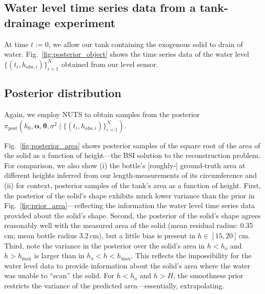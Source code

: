 \documentclass[openacc]{rsproca_new}%
\newcommand\thedata {$\{(t_i,h_{\text{obs}, i})\}_{i=1}^{N}$\xspace}
\newcommand\thedatanomath {\{(t_i,h_{\text{obs}, i})\}_{i=1}^{N}}
\begin{document}
\subsection{Water level time series data from a tank-drainage experiment}
At time $t:=0$, we allow our tank containing the exogenous solid to drain of water. Fig.~\ref{fig:posterior_object} shows the time series data of the water level \thedata obtained from our level sensor.

\subsection{Posterior distribution}
Again, we employ NUTS to obtain samples from the posterior $\pi_{\text{post}}(h_0, \boldsymbol \alpha, \boldsymbol \theta, \sigma^2 \mid \thedatanomath)$. 

Fig.~\ref{fig:posterior_area} shows posterior samples of the square root of the area of the solid as a function of height---the BSI solution to the reconstruction problem. 
For comparison, we also show (i) the bottle's [roughly-] ground-truth area at different heights inferred from our length-measurements of its circumference and (ii) for context, posterior samples of the tank's area as a function of height. First, the posterior of the solid's shape exhibits much lower variance than the prior in Fig.~\ref{fig:prior_area}---reflecting the information the water level time series data provided about the solid's shape. 
Second, the posterior of the solid's shape agrees reasonably well with the measured area of the solid (mean residual radius: 0.35\,cm; mean bottle radius 3.2\,cm), but a little bias is present in $h\in[15, 20]$\,cm.
Third, note the variance in the posterior over the solid's area in $h<h_o$ and $h>h_{\text{max}}$ is larger than in $h_o < h < h_{\text{max}}$. This reflects the impossibility for the water level data to provide information about the solid's area where the water was unable to ``scan'' the solid. 
For $h<h_o$ and $h>H$, the smoothness prior restricts the variance of the predicted area---essentially, extrapolating. 
\end{document}
